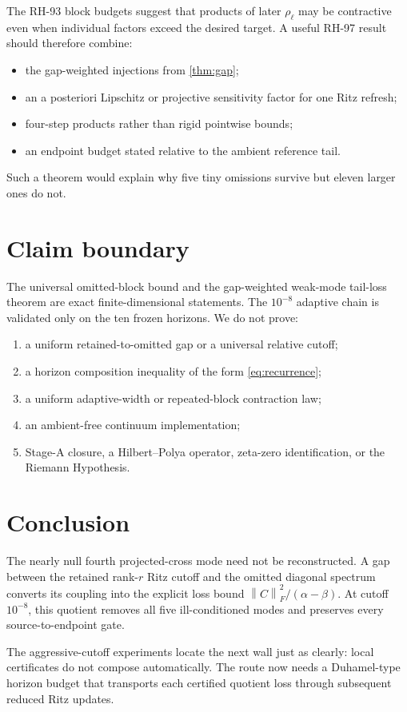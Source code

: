 \documentclass[11pt]{article}
\theoremstyle{definition}
\theoremstyle{remark}
\newcommand{\norm}[1]{\left\lVert#1\right\rVert}
\begin{document}
The RH-93 block budgets suggest that products of later $\rho_\ell$ may be
contractive even when individual factors exceed the desired target.  A useful
RH-97 result should therefore combine:
\begin{itemize}[leftmargin=2em]
\item the gap-weighted injections from \cref{thm:gap};
\item an a posteriori Lipschitz or projective sensitivity factor for one Ritz
refresh;
\item four-step products rather than rigid pointwise bounds;
\item an endpoint budget stated relative to the ambient reference tail.
\end{itemize}
Such a theorem would explain why five tiny omissions survive but eleven
larger ones do not.

\section{Claim boundary}

The universal omitted-block bound and the gap-weighted weak-mode tail-loss
theorem are exact finite-dimensional statements.  The $10^{-8}$ adaptive
chain is validated only on the ten frozen horizons.  We do not prove:
\begin{enumerate}[leftmargin=2em]
\item a uniform retained-to-omitted gap or a universal relative cutoff;
\item a horizon composition inequality of the form \eqref{eq:recurrence};
\item a uniform adaptive-width or repeated-block contraction law;
\item an ambient-free continuum implementation;
\item Stage-A closure, a Hilbert--Polya operator, zeta-zero identification, or
the Riemann Hypothesis.
\end{enumerate}

\section{Conclusion}

The nearly null fourth projected-cross mode need not be reconstructed.  A
gap between the retained rank-$r$ Ritz cutoff and the omitted diagonal
spectrum converts its coupling into the explicit loss bound
$\norm C_F^2/(\alpha-\beta)$.  At cutoff $10^{-8}$, this quotient removes all
five ill-conditioned modes and preserves every source-to-endpoint gate.

The aggressive-cutoff experiments locate the next wall just as clearly:
local certificates do not compose automatically.  The route now needs a
Duhamel-type horizon budget that transports each certified quotient loss
through subsequent reduced Ritz updates.



\end{document}
